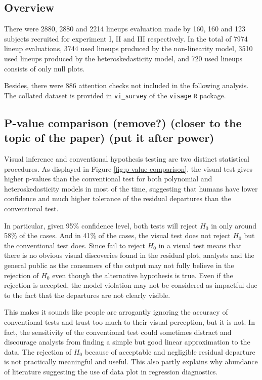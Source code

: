 \documentclass[]{interact}
\theoremstyle{plain}%
\theoremstyle{definition}
\theoremstyle{remark}
\begin{document}
\hypertarget{overview}{%
\subsection{Overview}\label{overview}}

There were 2880, 2880 and 2214 lineups evaluation made by 160, 160 and
123 subjects recruited for experiment I, II and III respectively. In the
total of 7974 lineup evaluations, 3744 used lineups produced by the
non-linearity model, 3510 used lineups produced by the
heteroskedasticity model, and 720 used lineups consists of only null
plots.

Besides, there were 886 attention checks not included in the following
analysis. The collated dataset is provided in \texttt{vi\_survey} of the
\texttt{visage} \texttt{R} package.

\hypertarget{p-value-comparison-remove-closer-to-the-topic-of-the-paper-put-it-after-power}{%
\subsection{P-value comparison (remove?) (closer to the topic of the
paper) (put it after
power)}\label{p-value-comparison-remove-closer-to-the-topic-of-the-paper-put-it-after-power}}

Visual inference and conventional hypothesis testing are two distinct
statistical procedures. As displayed in Figure
\ref{fig:p-value-comparison}, the visual test gives higher p-values than
the conventional test for both polynomial and heteroskedasticity models
in most of the time, suggesting that humans have lower confidence and
much higher tolerance of the residual departures than the conventional
test.

In particular, given 95\% confidence level, both tests will reject
\(H_0\) in only around 58\% of the cases. And in 41\% of the cases, the
visual test does not reject \(H_0\) but the conventional test does.
Since fail to reject \(H_0\) in a visual test means that there is no
obvious visual discoveries found in the residual plot, analysts and the
general public as the consumers of the output may not fully believe in
the rejection of \(H_0\) even though the alternative hypothesis is true.
Even if the rejection is accepted, the model violation may not be
considered as impactful due to the fact that the departures are not
clearly visible.

This makes it sounds like people are arrogantly ignoring the accuracy of
conventional tests and trust too much to their visual perception, but it
is not. In fact, the sensitivity of the conventional test could
sometimes distract and discourage analysts from finding a simple but
good linear approximation to the data. The rejection of \(H_0\) because
of acceptable and negligible residual departure is not practically
meaningful and useful. This also partly explains why abundance of
literature suggesting the use of data plot in regression diagnostics.
\end{document}
